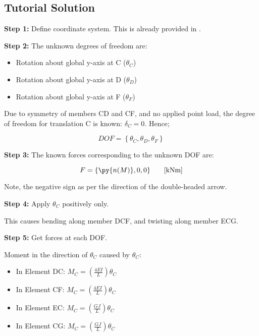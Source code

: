\documentclass[a4paper,11pt]{article}
\begin{document}
\begin{hidden}	
\clearpage
\section{Tutorial Solution}

\textbf{Step 1:} Define coordinate system. This is already provided in . 

\textbf{Step 2:} The unknown degrees of freedom are: 

\begin{itemize}
	\item Rotation about global y-axis at C ($\theta_C$)
	\item Rotation about global y-axis at D ($\theta_D$)
	\item Rotation about global y-axis at F ($\theta_F$)
\end{itemize} 

Due to symmetry of members CD and CF, and no applied point load, the degree of freedom for translation C is known: $\delta_C = 0$. Hence; 

\begin{equation}
	DOF = \left\{\theta_C,\theta_D,\theta_F\right\}
\end{equation}

\textbf{Step 3:} The known forces corresponding to the unknown DOF are: 

\begin{equation}
	F = \left\{ \py{n(M)},0,0 \right\} \textrm{\hspace{0.5cm} [kNm]}
\end{equation}

Note, the negative sign as per the direction of the double-headed arrow. 
	
\textbf{Step 4:} Apply $\theta_C$ positively only. 

This causes bending along member DCF, and twisting along member ECG. 

\textbf{Step 5:} Get forces at each DOF. 

Moment in the direction of $\theta_C$ caused by $\theta_C$: 

\begin{itemize}
	\item In Element DC: $M_C = \left(\frac{4EI}{L}\right)\theta_C$
	\item In Element CF: $M_C = \left(\frac{4EI}{L}\right)\theta_C$
	\item In Element EC: $M_C = \left(\frac{GJ}{L}\right)\theta_C$
	\item In Element CG: $M_C = \left(\frac{GJ}{L}\right)\theta_C$
\end{itemize}	


\end{hidden}
\end{document}
